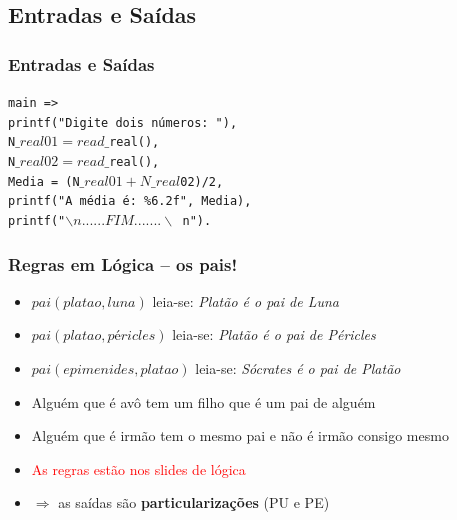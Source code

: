 \documentclass[10pt]{beamer}
\begin{document}

\subsection{Entradas e Sa\'idas}
\begin{frame}
    \frametitle{Entradas e Saídas}
    \texttt{main =>}\\
    \texttt{printf("Digite dois números: "),}\\
    \texttt{N$\_real01 = read\_$real(),}\\
    \texttt{N$\_real02 = read\_$real(),}\\
    \texttt{Media = (N$\_real01+N\_real$02)/2,}\\
    \texttt{printf("A média é: \%6.2f", Media),}\\
    \texttt{printf("$\backslash n ......FIM....... \backslash$ n").}
\end{frame}




\begin{frame}
    \frametitle{Regras  em Lógica -- os pais!}
    \begin{itemize}
    
    \item $pai(platao, luna)$ \hspace{1.5cm} leia-se: \textit{Platão é o pai de Luna}
    \item $pai(platao, péricles)$ \hspace{1.5cm} leia-se: \textit{Platão é o pai de Péricles}
    \item $pai(epimenides, platao)$ \hspace{1.5cm} leia-se: \textit{Sócrates é o pai de Platão}
    
    \pause
    
    \item Alguém que é avô tem um filho que é um pai de alguém
    \pause
    
    \item Alguém que é irmão tem o mesmo pai e não é irmão consigo mesmo
    \pause
    
    \item \textcolor{red}{As regras estão nos slides de lógica}

    \item  $\Rightarrow $ as saídas são \textbf{particularizações} (PU e PE)
 
    \end{itemize}
\end{frame}
\end{document}
